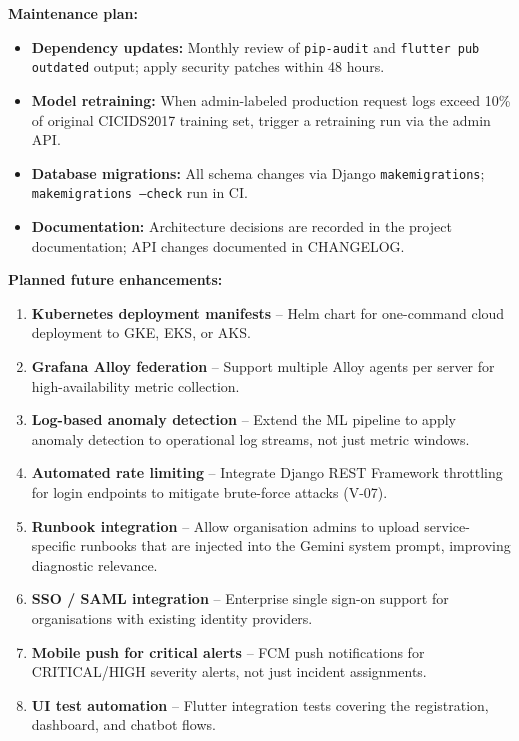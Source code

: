 \textbf{Maintenance plan:}
\begin{itemize}
  \item \textbf{Dependency updates:} Monthly review of \texttt{pip-audit}
        and \texttt{flutter pub outdated} output; apply security patches
        within 48 hours.
  \item \textbf{Model retraining:} When admin-labeled production request logs
        exceed 10\% of original CICIDS2017 training set, trigger a retraining
        run via the admin API.
  \item \textbf{Database migrations:} All schema changes via Django
        \texttt{makemigrations}; \texttt{makemigrations --check} run in CI.
  \item \textbf{Documentation:} Architecture decisions are recorded in the project documentation; API changes documented in CHANGELOG.
\end{itemize}

\textbf{Planned future enhancements:}

\begin{enumerate}
  \item \textbf{Kubernetes deployment manifests} -- Helm chart for one-command
        cloud deployment to GKE, EKS, or AKS.
  \item \textbf{Grafana Alloy federation} -- Support multiple Alloy agents
        per server for high-availability metric collection.
  \item \textbf{Log-based anomaly detection} -- Extend the ML pipeline to
        apply anomaly detection to operational log streams, not just metric
        windows.
  \item \textbf{Automated rate limiting} -- Integrate Django REST Framework
        throttling for login endpoints to mitigate brute-force attacks (V-07).
  \item \textbf{Runbook integration} -- Allow organisation admins to upload
        service-specific runbooks that are injected into the Gemini system
        prompt, improving diagnostic relevance.
  \item \textbf{SSO / SAML integration} -- Enterprise single sign-on support
        for organisations with existing identity providers.
  \item \textbf{Mobile push for critical alerts} -- FCM push notifications
        for CRITICAL/HIGH severity alerts, not just incident assignments.
  \item \textbf{UI test automation} -- Flutter integration tests covering
        the registration, dashboard, and chatbot flows.
\end{enumerate}

